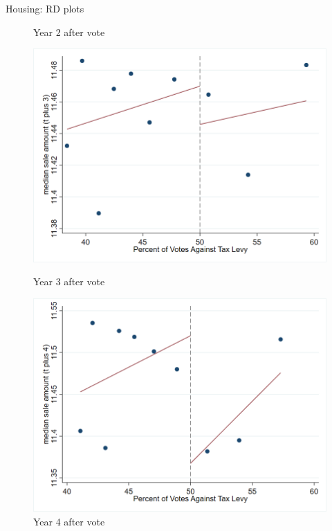 \documentclass{beamer}
\begin{document}
\begin{frame}{Housing: RD plots}
\begin{figure}[htbp]
\begin{minipage}[b]{0.35\textwidth}
        \caption{Year 2 after vote}
        \label{fig:image2}
    \end{minipage}
    \vspace{1em}
    \begin{minipage}[b]{0.35\textwidth}
        \centering
        \includegraphics[width=\textwidth]{assets/imgs/rd_plot_median_sale_amount_t_plus_3_tri_mserd_1_2_within.png}
        \caption{Year 3 after vote}
        \label{fig:image3}
    \end{minipage}
    \hfill
    \begin{minipage}[b]{0.35\textwidth}
        \centering
        \includegraphics[width=\textwidth]{assets/imgs/rd_plot_median_sale_amount_t_plus_4_tri_mserd_1_2_within.png}
        \caption{Year 4 after vote}
        \label{fig:image4}
    \end{minipage}
\end{figure}

\end{frame}
\end{document}
